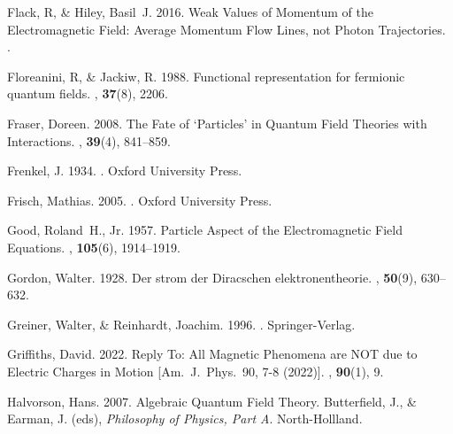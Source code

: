 \documentclass[onecolumn,secnumarabic,amsmath,amssymb,balancelastpage,nofootinbib]{article}
\begin{document}
\begin{thebibliography}{}
Flack, R, \& Hiley, Basil~J. 2016.
\newblock Weak Values of Momentum of the Electromagnetic Field: Average
  Momentum Flow Lines, not Photon Trajectories.
.

Floreanini, R, \& Jackiw, R. 1988.
\newblock Functional representation for fermionic quantum fields.
, {\bf 37}(8), 2206.

Fraser, Doreen. 2008.
\newblock The Fate of `Particles' in Quantum Field Theories with Interactions.
, {\bf
  39}(4), 841--859.

Frenkel, J. 1934.
.
\newblock Oxford University Press.

Frisch, Mathias. 2005.
.
\newblock Oxford University Press.

Good, Roland~H., Jr. 1957.
\newblock Particle Aspect of the Electromagnetic Field Equations.
, {\bf 105}(6), 1914--1919.

Gordon, Walter. 1928.
\newblock Der strom der Diracschen elektronentheorie.
, {\bf 50}(9), 630--632.

Greiner, Walter, \& Reinhardt, Joachim. 1996.
.
\newblock Springer-Verlag.

Griffiths, David. 2022.
\newblock Reply To: All Magnetic Phenomena are NOT due to Electric Charges in
  Motion [Am.\ J.\ Phys.\ 90, 7-8 (2022)].
, {\bf 90}(1), 9.

Halvorson, Hans. 2007.
\newblock Algebraic Quantum Field Theory.
 Butterfield, J., \& Earman, J. (eds), {\em
  Philosophy of Physics, Part A}.
\newblock North-Hollland.


\end{thebibliography}
\end{document}
